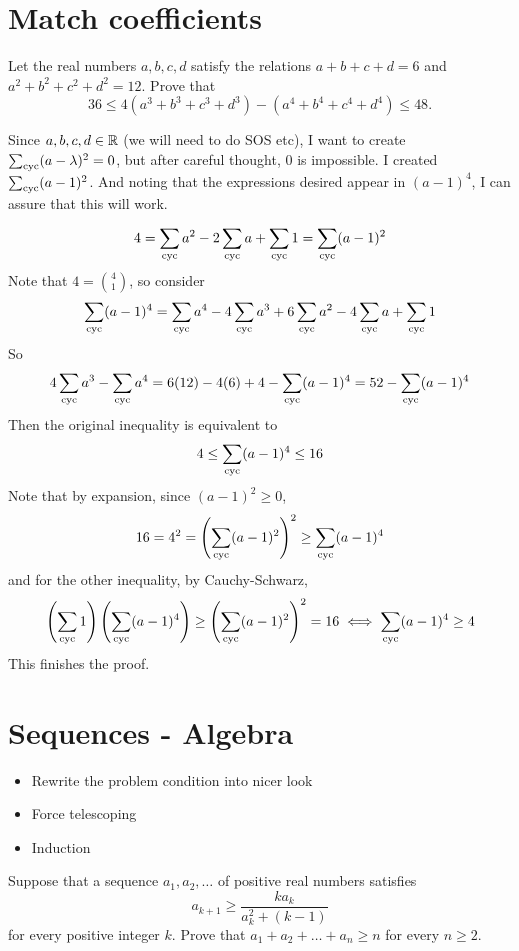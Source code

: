 \documentclass[11pt]{scrartcl}
\begin{document}
\section{Match coefficients}
\begin{Problem}
Let the real numbers $a,b,c,d$ satisfy the relations $a+b+c+d=6$ and $a^2+b^2+c^2+d^2=12.$ Prove that
\[36 \leq 4 \left(a^3+b^3+c^3+d^3\right) - \left(a^4+b^4+c^4+d^4 \right) \leq 48.\]
\end{Problem}
\begin{lesson}
Since $a,b,c,d \in \mathbb R$ (we will need to do SOS etc), I want to create $\sum_{\mathrm{cyc}} (a-\lambda)^2 = 0$, but after careful thought, 0 is impossible. I created $\sum_{\mathrm{cyc}} (a-1)^2$. And noting that the expressions desired appear in $(a-1)^4$, I can assure that this will work.
\end{lesson}
\[4 = \sum_{\mathrm{cyc}} a^2 - 2\sum_{\mathrm{cyc}} a + \sum_{\mathrm{cyc}} 1 = \sum_{\mathrm{cyc}} (a-1)^2\]
Note that $4 = \binom{4}{1}$, so consider
\[\sum_{\mathrm{cyc}} (a-1)^4 = \sum_{\mathrm{cyc}} a^4 - 4 \sum_{\mathrm{cyc}} a^3 + 6 \sum_{\mathrm{cyc}} a^2 - 4 \sum_{\mathrm{cyc}} a + \sum_{\mathrm{cyc}} 1\]
So
\[4\sum_{\mathrm{cyc}} a^3 - \sum_{\mathrm{cyc}} a^4 = 6(12) - 4(6) + 4 - \sum_{\mathrm{cyc}} (a-1)^4 = 52 - \sum_{\mathrm{cyc}} (a-1)^4\]
Then the original inequality is equivalent to
\[4 \le \sum_{\mathrm{cyc}} (a-1)^4 \le 16\]
Note that by expansion, since $(a-1)^2 \ge 0$,
\[16 = 4^2 = \left(\sum_{\mathrm{cyc}} (a-1)^2\right)^2 \ge \sum_{\mathrm{cyc}} (a-1)^4\]
and for the other inequality, by Cauchy-Schwarz,
\[\left(\sum_{\mathrm{cyc}} 1\right) \left(\sum_{\mathrm{cyc}} (a-1)^4\right) \ge \left(\sum_{\mathrm{cyc}} (a-1)^2\right)^2 = 16 \iff \sum_{\mathrm{cyc}} (a-1)^4 \ge 4\]
This finishes the proof.



\section{Sequences - Algebra}

\begin{itemize}
    \item Rewrite the problem condition into nicer look
    \item Force telescoping
    \item Induction
\end{itemize}

\begin{Problem}
Suppose that a sequence $a_1,a_2,\ldots$ of positive real numbers satisfies\[a_{k+1}\geq\frac{ka_k}{a_k^2+(k-1)}\]for every positive integer $k$. Prove that $a_1+a_2+\ldots+a_n\geq n$ for every $n\geq2$.
\end{Problem}
\end{document}
